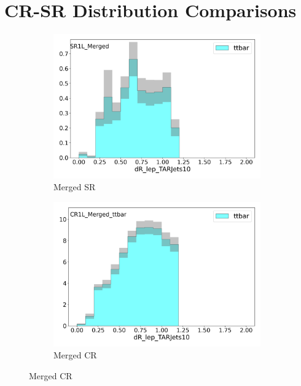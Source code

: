 \FloatBarrier

\section{CR-SR Distribution Comparisons}
\label{section:CRSR}

\begin{figure}[htbp]
  \centering

    \begin{subfigure}{0.49\textwidth}
    \includegraphics[width = 0.98\textwidth]{Figures/4/CRSR/SR1L_Merged/dR_lep_TARJets10.png}
    \caption{Merged SR \drTARl}
    \end{subfigure}
    \begin{subfigure}{0.49\textwidth}
    \includegraphics[width = 0.98\textwidth]{Figures/4/CRSR/CR1L_Merged_ttbar/dR_lep_TARJets10.png}
    \caption{Merged CR \drTARl}

\end{subfigure}
\end{figure}
